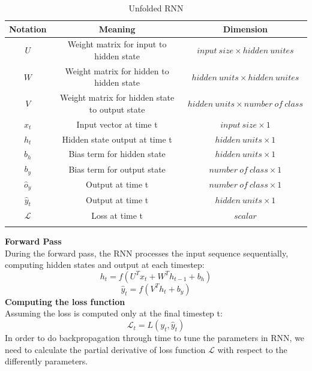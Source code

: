 \documentclass[12pt,a4paper]{article}
\begin{document}
\begin{longtable}{|c|c|c|}
    \hline
    \textbf{Notation} & \textbf{Meaning} & \textbf{Dimension}\\
    \hline
    $U$          & Weight matrix for input to hidden state       & $input\ size\times hidden\ unites$\\
    $W$          & Weight matrix for hidden to hidden state      & $hidden\ units\times hidden\ unites$\\
    $V$          & Weight matrix for hidden state to output state& $hidden\ units\times number\ of\ class$\\
    $x_t$        & Input vector at time t                        & $input\ size\times 1$\\
    $h_t$        & Hidden state output at time t                 & $hidden\ units\times 1$\\
    $b_h$        & Bias term for hidden state                    & $hidden\ units\times 1$\\
    $b_y$        & Bias term for output state                    & $number\ of\ class\times 1$\\
    $\hat{o}_y$  & Output at time t                              & $number\ of\ class\times 1$\\
    $\hat{y}_t$  & Output at time t                              & $hidden\ units\times 1$\\
    $\mathcal{L}$& Loss at time t                                & $scalar$\\
    \hline
    \caption{Unfolded RNN}
\end{longtable}
\noindent \textbf{Forward Pass}
\\[1ex]
During the forward pass, the RNN processes the input sequence sequentially, computing hidden states and output at each timestep:
\begin{equation}
    h_t = f(U^Tx_{t}+W^Th_{t-1}+b_h)
\end{equation}
\begin{equation}
    \hat{y}_t = f(V^Th_t+b_y)
\end{equation}
\newline  %
\noindent \textbf{Computing the loss function}
\\[1ex]
Assuming the loss is computed only at the final timestep t:
\begin{equation}
    \mathcal{L}_t = L(y_t, \hat{y}_t)
\end{equation}
In order to do backpropagation through time to tune the parameters in RNN, we need to calculate the partial derivative of loss function $\mathcal{L}$ with respect to the differently parameters.\\
\end{document}
